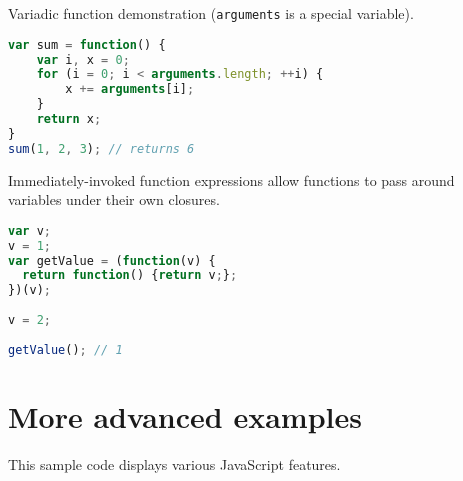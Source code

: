 Variadic function demonstration (\texttt{arguments} is a special variable).


\begin{lstlisting}[language=JavaScript]
var sum = function() {
    var i, x = 0;
    for (i = 0; i < arguments.length; ++i) {
        x += arguments[i];
    }
    return x;
}
sum(1, 2, 3); // returns 6
\end{lstlisting}

Immediately-invoked function expressions allow functions to pass around variables under their own closures.

\begin{lstlisting}[language=JavaScript]
var v;
v = 1;
var getValue = (function(v) {
  return function() {return v;};
})(v);
 
v = 2;
 
getValue(); // 1
\end{lstlisting}

\section{More advanced examples}

This sample code displays various JavaScript features.




